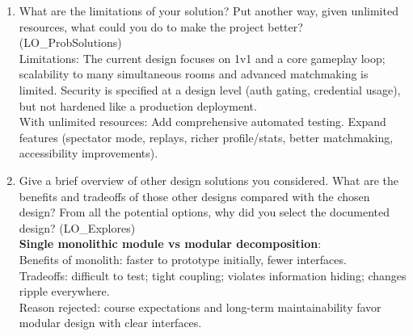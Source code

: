 \documentclass[12pt, titlepage]{article}
\begin{document}
\begin{enumerate}
  requirements, hazard analysis, etc), it any, needed to be changed, and why?\\
We updated the MG-to-MIS mapping to reflect changes in the MG dependency structure (e.g., ``Uses'' relationships and leaf-module grouping) so the MIS matched the latest architecture.
  \item What are the limitations of your solution?  Put another way, given
  unlimited resources, what could you do to make the project better? (LO\_ProbSolutions)\\
Limitations: The current design focuses on 1v1 and a core gameplay loop; scalability to many simultaneous rooms and advanced matchmaking is limited.
Security is specified at a design level (auth gating, credential usage), but not hardened like a production deployment.\\
With unlimited resources: Add comprehensive automated testing. Expand features (spectator mode, replays, richer profile/stats, better matchmaking, accessibility improvements).
  \item Give a brief overview of other design solutions you considered.  What
  are the benefits and tradeoffs of those other designs compared with the chosen
  design?  From all the potential options, why did you select the documented design?
  (LO\_Explores)\\
\textbf{Single monolithic module vs modular decomposition}: \\
Benefits of monolith: faster to prototype initially, fewer interfaces.\\
Tradeoffs: difficult to test; tight coupling; violates information hiding; changes ripple everywhere.\\
Reason rejected: course expectations and long-term maintainability favor modular design with clear interfaces.
\end{enumerate}
\end{document}
